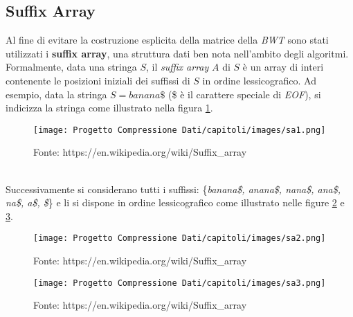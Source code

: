 \subsection{Suffix Array}
Al fine di evitare la costruzione esplicita della matrice della \emph{BWT} sono stati utilizzati i \textbf{suffix array}, una struttura dati ben nota nell'ambito degli algoritmi. Formalmente, data una stringa $S$, il \emph{suffix array} $A$ di $S$ è un array di interi contenente le posizioni iniziali dei suffissi di $S$ in ordine lessicografico. Ad esempio, data la stringa $S=banana\$$ (\$ è il carattere speciale di \emph{EOF}), si indicizza la stringa come illustrato nella figura \ref{fig:sa1}.
\begin{figure}[h]
    \centering
    \texttt{[image: Progetto Compressione Dati/capitoli/images/sa1.png]}
\caption{Fonte: https://en.wikipedia.org/wiki/Suffix\_array}
    \label{fig:sa1}
\end{figure}\\
Successivamente si considerano tutti i suffissi: \{\emph{banana\$, anana\$, nana\$, ana\$, na\$, a\$, \$}\} e li si dispone in ordine lessicografico come illustrato nelle figure \ref{fig:sa2} e \ref{fig:sa3}.
\begin{figure}[h]
    \centering
    \texttt{[image: Progetto Compressione Dati/capitoli/images/sa2.png]}
\caption{Fonte: https://en.wikipedia.org/wiki/Suffix\_array}
    \label{fig:sa2}
\end{figure}
\begin{figure}[h]
    \centering
    \texttt{[image: Progetto Compressione Dati/capitoli/images/sa3.png]}
\caption{Fonte: https://en.wikipedia.org/wiki/Suffix\_array}
    \label{fig:sa3}
\end{figure}\\
